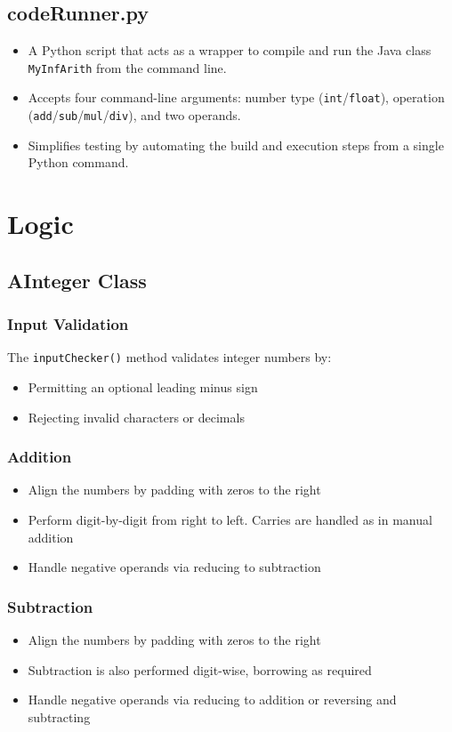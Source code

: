 \documentclass[12pt]{article}
\begin{document}
\subsection{codeRunner.py}
\begin{itemize}
    \item A Python script that acts as a wrapper to compile and run the Java class \texttt{MyInfArith} from the command line.
    \item Accepts four command-line arguments: number type (\texttt{int}/\texttt{float}), operation (\texttt{add}/\texttt{sub}/\texttt{mul}/\texttt{div}), and two operands.
    \item Simplifies testing by automating the build and execution steps from a single Python command.
\end{itemize}

\section{Logic}

\subsection{AInteger Class}

\subsubsection{Input Validation}
The \texttt{inputChecker()} method validates integer numbers by:
\begin{itemize}
    \item Permitting an optional leading minus sign
    \item Rejecting invalid characters or decimals
\end{itemize}

\subsubsection{Addition}
\begin{itemize}
    \item Align the numbers by padding with zeros to the right
    \item Perform digit-by-digit from right to left. Carries are handled as in manual addition
    \item Handle negative operands via reducing to subtraction
\end{itemize}

\subsubsection{Subtraction}
\begin{itemize}
    \item Align the numbers by padding with zeros to the right
    \item Subtraction is also performed digit-wise, borrowing as required
    \item Handle negative operands via reducing to addition or reversing and subtracting
\end{itemize}
\end{document}
